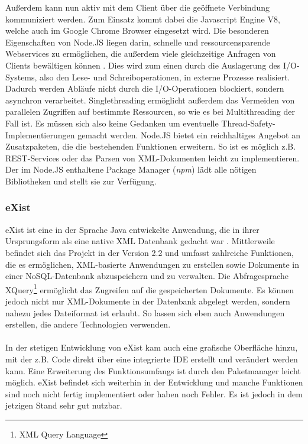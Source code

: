 Außerdem kann nun aktiv mit dem Client über die geöffnete Verbindung kommuniziert werden. Zum Einsatz kommt dabei die Javascript Engine V8, welche auch im Google Chrome Browser eingesetzt wird. Die besonderen Eigenschaften von Node.JS liegen darin, schnelle und ressourcensparende Webservices zu ermöglichen, die außerdem viele gleichzeitige Anfragen von Clients bewältigen können \cite{cantelon:nodejs}. Dies wird zum einen durch die Auslagerung des I/O-Systems, also den Lese- und Schreiboperationen, in externe Prozesse realisiert. Dadurch werden Abläufe nicht durch die I/O-Operationen blockiert, sondern asynchron verarbeitet. Singlethreading ermöglicht außerdem das Vermeiden von parallelen Zugriffen auf bestimmte Ressourcen, so wie es bei Multithreading der Fall ist. Es müssen sich also keine Gedanken um eventuelle Thread-Safety-Implementierungen gemacht werden. Node.JS bietet ein reichhaltiges Angebot an Zusatzpaketen, die die bestehenden Funktionen erweitern. So ist es möglich z.B. REST-Services oder das Parsen von XML-Dokumenten leicht zu implementieren. Der im Node.JS enthaltene Package Manager (\textit{npm}) lädt alle nötigen Bibliotheken und stellt sie zur Verfügung.

\subsubsection{eXist}
eXist \cite{existwebsite} ist eine in der Sprache Java entwickelte Anwendung, die in ihrer Ursprungsform als eine native XML Datenbank gedacht war \cite{siegel:exist}. Mittlerweile befindet sich das Projekt in der Version 2.2 und umfasst zahlreiche Funktionen, die es ermöglichen, XML-basierte Anwendungen zu erstellen sowie Dokumente in einer NoSQL-Datenbank abzuspeichern und zu verwalten. Die Abfragesprache XQuery\footnote[1]{XML Query Language} ermöglicht das Zugreifen auf die gespeicherten Dokumente. Es können jedoch nicht nur XML-Dokumente in der Datenbank abgelegt werden, sondern nahezu jedes Dateiformat ist erlaubt. So lassen sich eben auch Anwendungen erstellen, die andere Technologien verwenden.
\\
\\
In der stetigen Entwicklung von eXist kam auch eine grafische Oberfläche hinzu, mit der z.B. Code direkt über eine integrierte IDE erstellt und verändert werden kann. Eine Erweiterung des Funktionsumfangs ist durch den Paketmanager leicht möglich. eXist befindet sich weiterhin in der Entwicklung und manche Funktionen sind noch nicht fertig implementiert oder haben noch Fehler. Es ist jedoch in dem jetzigen Stand sehr gut nutzbar.

